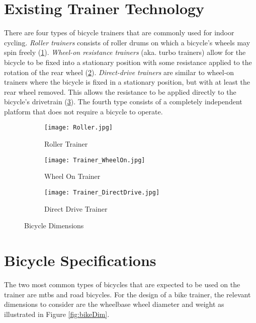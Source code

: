 \section{Existing Trainer Technology}
\label{sec:train}

There are four types of bicycle trainers that are commonly used for indoor cycling. \textit{Roller trainers} consists of roller drums on which a bicycle's wheels may spin freely (\ref{fig:roller}). \textit{Wheel-on resistance trainers} (aka. turbo trainers) allow for the bicycle to be fixed into a stationary position with some resistance applied to the rotation of the rear wheel (\ref{fig:wheelon}). \textit{Direct-drive trainers} are similar to wheel-on trainers where the bicycle is fixed in a stationary position, but with at least the rear wheel removed. This allows the resistance to be applied directly to the bicycle's drivetrain (\ref{fig:directdrive}). The fourth type consists of a completely independent platform that does not require a bicycle to operate. \citep{Alff:2011}

\vspace{-0.5cm}

\begin{figure}[H]
	\centering
	\begin{subfigure}{.3\textwidth}
		\centering
		\texttt{[image: Roller.jpg]}
		\caption{Roller Trainer}
		\label{fig:roller}
	\end{subfigure}
	\hfill
	\begin{subfigure}{.3\textwidth}
		\centering
		\texttt{[image: Trainer\_WheelOn.jpg]}
		\caption{Wheel On Trainer}
		\label{fig:wheelon}
	\end{subfigure}
	\hfill
	\begin{subfigure}{.3\textwidth}
		\centering
		\texttt{[image: Trainer\_DirectDrive.jpg]}
		\caption{Direct Drive Trainer}
		\label{fig:directdrive}
	\end{subfigure}
	\caption{Bicycle Dimensions}
	\label{fig:trainers}
	\citep{Zwift:2022}
\end{figure}

\newpage

\section{Bicycle Specifications}
\label{sec:specs}
The two most common types of bicycles that are expected to be used on the trainer are \acp{mtb} and road bicycles. For the design of a bike trainer, the relevant dimensions to consider are the wheelbase wheel diameter and weight as illustrated in Figure \ref{fig:bikeDim}.


